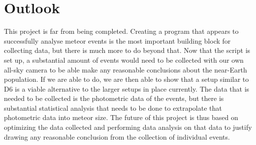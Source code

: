 \section{Outlook}
This project is far from being completed. Creating a program that appears to successfully analyse meteor events is the most important building block for collecting data, but there is much more to do beyond that. Now that the script is set up, a substantial amount of events would need to be collected with our own all-sky camera to be able make any reasonable conclusions about the near-Earth population. If we are able to do, we are then able to show that a setup similar to D6 is a viable alternative to the larger setups in place currently.  The data that is needed to be collected is the photometric data of the events, but there is substantial statistical analysis that needs to be done to extrapolate that photometric data into meteor size. The future of this project is thus based on optimizing the data collected and performing data analysis on that data to justify drawing any reasonable conclusion from the collection of individual events.
